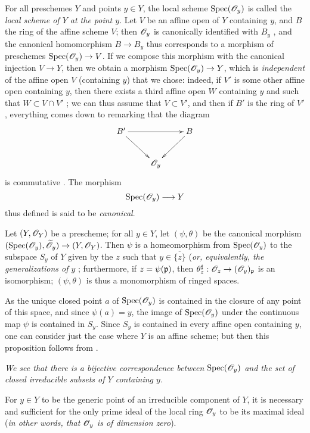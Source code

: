 For all preschemes $Y$ and points $y\in Y$, the local scheme ${\mathop{\mathrm{Spec}}\nolimits}(\mathscr{O}_y)$
is called the {\em local scheme of $Y$ at the point $y$}. Let $V$ be an affine
open of $Y$ containing $y$, and $B$ the ring of the affine scheme $V$; then
$\mathscr{O}_y$ is canonically identified with $B_y$ , and the canonical
homomorphism $B\to B_y$ thus corresponds  to a morphism of preschemes
${\mathop{\mathrm{Spec}}\nolimits}(\mathscr{O}_y)\to V$. If we compose this morphism with the canonical injection
$V\to Y$, then we obtain a morphism ${\mathop{\mathrm{Spec}}\nolimits}(\mathscr{O}_y)\to Y$, which is
{\em independent} of the affine open $V$ (containing $y$) that we chose:
indeed, if $V'$ is some other affine open containing $y$, then there exists a
third affine open $W$ containing $y$ and such that $W\subset V\cap V'$ ;
we can thus assume that $V\subset V'$, and then if $B'$ is the ring of $V'$,
everything comes down to remarking that the diagram
\[
  \xymatrix{
    B'\ar[rr]\ar[dr] & & B\ar[dl]\\
    & \OO_y &
  }
\]
is commutative . The morphism
\[
  {\mathop{\mathrm{Spec}}\nolimits}(\mathscr{O}_y)\longrightarrow Y
\]
thus defined is said to be {\it canonical}.
\begin{prop}[2.4.2]
\label{1.2.4.2}
Let $(Y,\mathscr{O}_Y)$ be a prescheme; for all $y\in Y$, let $(\psi,\theta)$ be the canonical
morphism $({\mathop{\mathrm{Spec}}\nolimits}(\mathscr{O}_y),\widetilde{\mathscr{O}}_y)\to(Y,\mathscr{O}_Y)$. Then $\psi$ is a homeomorphism
from ${\mathop{\mathrm{Spec}}\nolimits}(\mathscr{O}_y)$ to the subspace $S_y$ of $Y$ given by the $z$ such that
$y\in\overline{\{z\}}$ ({\em or, equivalently, the generalizations of $y$
}; furthermore, if $z=\psi(\mathfrak{p})$, then
$\theta_z^\sharp:\mathscr{O}_z\to(\mathscr{O}_y)_\mathfrak{p}$ is an isomorphism; $(\psi,\theta)$
is thus a monomorphism of ringed spaces.
\end{prop}

As the unique closed point $a$ of ${\mathop{\mathrm{Spec}}\nolimits}(\mathscr{O}_y)$ is contained in the closure of any
point of this space, and since $\psi(a)=y$, the image of ${\mathop{\mathrm{Spec}}\nolimits}(\mathscr{O}_y)$ under
the continuous map $\psi$ is contained in $S_y$. Since $S_y$ is contained in
every affine open containing $y$, one can consider just the case where $Y$ is an
affine scheme; but then this proposition follows from .

{\em We see  that there is a bijective correspondence between
${\mathop{\mathrm{Spec}}\nolimits}(\mathscr{O}_y)$ and the set of closed irreducible subsets of $Y$ containing $y$.}

\begin{cor}[2.4.3]
\label{1.2.4.3}
For $y\in Y$ to be the generic point of an
irreducible component of $Y$, it is necessary and sufficient for the only prime
ideal of the local ring $\mathscr{O}_y$ to be its maximal ideal ({\em in other words, that
$\mathscr{O}_y$ is of {\em dimension zero}}).
\end{cor}


